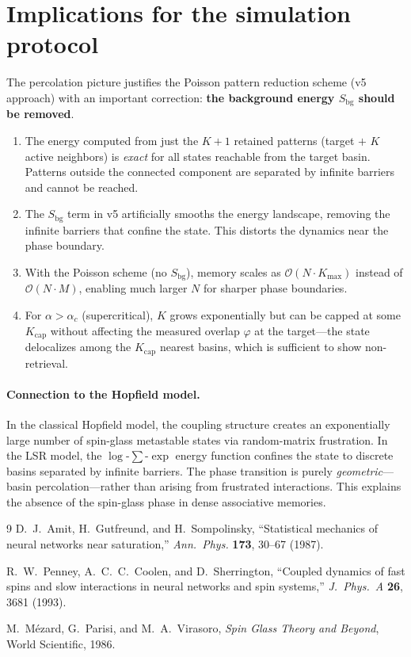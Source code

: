 \documentclass[11pt]{article}
\newcommand{\vp}{\varphi}
\begin{document}
\section{Implications for the simulation protocol}

The percolation picture justifies the Poisson pattern reduction
scheme (v5 approach) with an important correction:
\textbf{the background energy $S_\mathrm{bg}$ should be removed}.

\begin{enumerate}
  \item The energy computed from just the $K+1$ retained patterns
    (target $+$ $K$ active neighbors) is \emph{exact} for all states
    reachable from the target basin.  Patterns outside the connected
    component are separated by infinite barriers and cannot be reached.

  \item The $S_\mathrm{bg}$ term in v5 artificially smooths the energy
    landscape, removing the infinite barriers that confine the state.
    This distorts the dynamics near the phase boundary.

  \item With the Poisson scheme (no $S_\mathrm{bg}$), memory scales as
    $\mathcal{O}(N \cdot K_\mathrm{max})$ instead of
    $\mathcal{O}(N \cdot M)$, enabling much larger $N$
    for sharper phase boundaries.

  \item For $\alpha > \alpha_c$ (supercritical), $K$ grows
    exponentially but can be capped at some $K_\mathrm{cap}$
    without affecting the measured overlap $\vp$ at the target---the
    state delocalizes among the $K_\mathrm{cap}$ nearest basins,
    which is sufficient to show non-retrieval.
\end{enumerate}

\paragraph{Connection to the Hopfield model.}
In the classical Hopfield model, the coupling structure creates an
exponentially large number of spin-glass metastable states via
random-matrix frustration.  In the LSR model, the $\log$-$\sum$-$\exp$
energy function confines the state to discrete basins separated by
infinite barriers.  The phase transition is purely
\emph{geometric}---basin percolation---rather than arising
from frustrated interactions.  This explains the absence of the
spin-glass phase in dense associative memories.


\begin{thebibliography}{9}
  D.~J.~Amit, H.~Gutfreund, and H.~Sompolinsky,
  ``Statistical mechanics of neural networks near saturation,''
  \textit{Ann.\ Phys.} \textbf{173}, 30--67 (1987).

  R.~W.~Penney, A.~C.~C.~Coolen, and D.~Sherrington,
  ``Coupled dynamics of fast spins and slow interactions
  in neural networks and spin systems,''
  \textit{J.\ Phys.\ A} \textbf{26}, 3681 (1993).

  M.~M{\'e}zard, G.~Parisi, and M.~A.~Virasoro,
  \textit{Spin Glass Theory and Beyond}, World Scientific, 1986.
\end{thebibliography}
\end{document}
